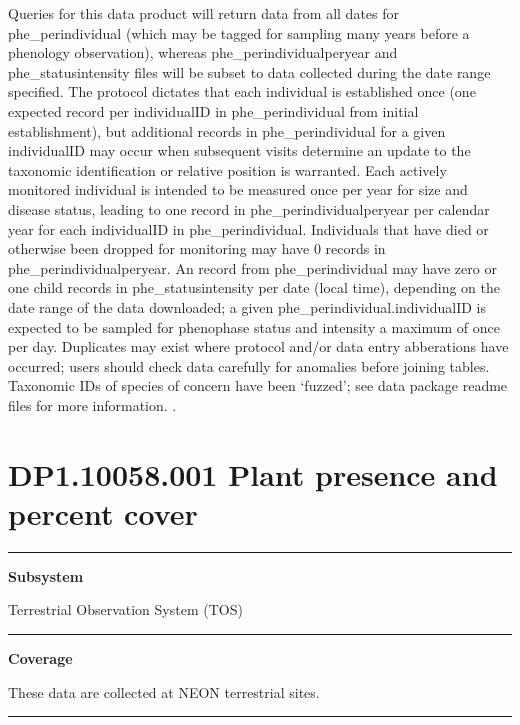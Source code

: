 \documentclass[]{article}
\begin{document}
Queries for this data product will return data from all dates for
phe\_perindividual (which may be tagged for sampling many years before a
phenology observation), whereas phe\_perindividualperyear and
phe\_statusintensity files will be subset to data collected during the
date range specified. The protocol dictates that each individual is
established once (one expected record per individualID in
phe\_perindividual from initial establishment), but additional records
in phe\_perindividual for a given individualID may occur when subsequent
visits determine an update to the taxonomic identification or relative
position is warranted. Each actively monitored individual is intended to
be measured once per year for size and disease status, leading to one
record in phe\_perindividualperyear per calendar year for each
individualID in phe\_perindividual. Individuals that have died or
otherwise been dropped for monitoring may have 0 records in
phe\_perindividualperyear. An record from phe\_perindividual may have
zero or one child records in phe\_statusintensity per date (local time),
depending on the date range of the data downloaded; a given
phe\_perindividual.individualID is expected to be sampled for phenophase
status and intensity a maximum of once per day. Duplicates may exist
where protocol and/or data entry abberations have occurred; users should
check data carefully for anomalies before joining tables. Taxonomic IDs
of species of concern have been `fuzzed'; see data package readme files
for more information. \newpage
.

\section{DP1.10058.001 Plant presence and percent
cover}\label{dp1.10058.001-plant-presence-and-percent-cover}

\begin{center}\rule{0.5\linewidth}{\linethickness}\end{center}

\textbf{Subsystem}

Terrestrial Observation System (TOS)

\begin{center}\rule{0.5\linewidth}{\linethickness}\end{center}

\textbf{Coverage}

These data are collected at NEON terrestrial sites.

\begin{center}\rule{0.5\linewidth}{\linethickness}\end{center}
\end{document}

